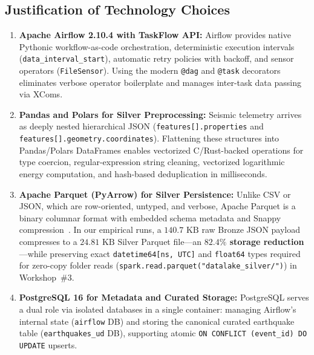 \subsection{Justification of Technology Choices}
\begin{enumerate}
    \item \textbf{Apache Airflow 2.10.4 with TaskFlow API:} Airflow provides native Pythonic workflow-as-code orchestration, deterministic execution intervals (\texttt{data\_interval\_start}), automatic retry policies with backoff, and sensor operators (\texttt{FileSensor}). Using the modern \texttt{@dag} and \texttt{@task} decorators eliminates verbose operator boilerplate and manages inter-task data passing via XComs.
    \item \textbf{Pandas and Polars for Silver Preprocessing:} Seismic telemetry arrives as deeply nested hierarchical JSON (\texttt{features[].properties} and \texttt{features[].geometry.coordinates}). Flattening these structures into Pandas/Polars DataFrames enables vectorized C/Rust-backed operations for type coercion, regular-expression string cleaning, vectorized logarithmic energy computation, and hash-based deduplication in milliseconds.
    \item \textbf{Apache Parquet (PyArrow) for Silver Persistence:} Unlike CSV or JSON, which are row-oriented, untyped, and verbose, Apache Parquet is a binary columnar format with embedded schema metadata and Snappy compression~\cite{parquet_docs}. In our empirical runs, a $140.7\text{ KB}$ raw Bronze JSON payload compresses to a $24.81\text{ KB}$ Silver Parquet file---an \textbf{$82.4\%$ storage reduction}---while preserving exact \texttt{datetime64[ns, UTC]} and \texttt{float64} types required for zero-copy folder reads (\texttt{spark.read.parquet("datalake\_silver/")}) in Workshop~\#3.
    \item \textbf{PostgreSQL 16 for Metadata and Curated Storage:} PostgreSQL serves a dual role via isolated databases in a single container: managing Airflow's internal state (\texttt{airflow} DB) and storing the canonical curated earthquake table (\texttt{earthquakes\_ud} DB), supporting atomic \texttt{ON CONFLICT (event\_id) DO UPDATE} upserts.
\end{enumerate}

